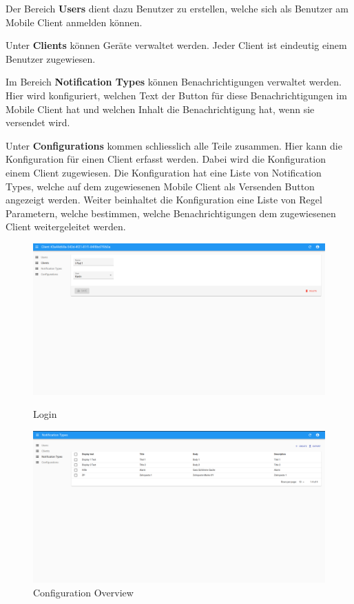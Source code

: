 Der Bereich \textbf{Users} dient dazu Benutzer zu erstellen, welche sich als Benutzer am Mobile Client anmelden können.

Unter \textbf{Clients} können Geräte verwaltet werden.
Jeder Client ist eindeutig einem Benutzer zugewiesen.

Im Bereich \textbf{Notification Types} können Benachrichtigungen verwaltet werden.
Hier wird konfiguriert, welchen Text der Button für diese Benachrichtigungen im Mobile Client hat und welchen Inhalt die Benachrichtigung hat, wenn sie versendet wird.

Unter \textbf{Configurations} kommen schliesslich alle Teile zusammen.
Hier kann die Konfiguration für einen Client erfasst werden.
Dabei wird die Konfiguration einem Client zugewiesen.
Die Konfiguration hat eine Liste von Notification Types, welche auf dem zugewiesenen Mobile Client als Versenden Button angezeigt werden.
Weiter beinhaltet die Konfiguration eine Liste von Regel Parametern, welche bestimmen, welche Benachrichtigungen dem zugewiesenen Client weitergeleitet werden.

\begin{figure}[h]
    \centering
    \begin{minipage}[b]{0.4\textwidth}
        \includegraphics[width=\textwidth]{graphics/screenshots/adminui/configuration}
        \caption{Login}
    \end{minipage}
    \hfill
    \begin{minipage}[b]{0.4\textwidth}
        \includegraphics[width=\textwidth]{graphics/screenshots/adminui/notification-type}
        \caption{Configuration Overview}
    \end{minipage}
    \label{fig:AdminUI-Screens2}
\end{figure}

